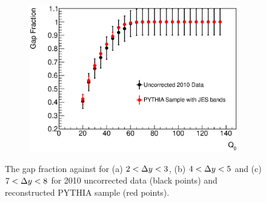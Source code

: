 \begin{figure}
        \begin{subfigure}[b]{0.5\textwidth}
                \centering
                \includegraphics[width=\textwidth]{figures/GBJ2/ControlPlots/Smeared7_8__Q0.eps}
        \end{subfigure}%
\caption[Comparison of the data and PYTHIA for the gap fraction as a function of \qz{}]{
The gap fraction against \qz{} for (a) $2<\mbox{$\Delta y$}{}<3$, (b) $4<\mbox{$\Delta y$}{}<5$ and (c) $7<\mbox{$\Delta y$}{}<8$ for 2010 uncorrected data (black points) and reconstructed PYTHIA sample (red points).
\label{GBJ2:Uncorr:Q0}}
\end{figure}

